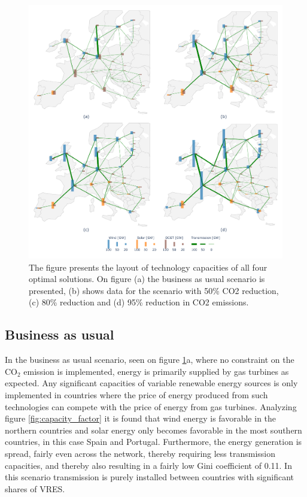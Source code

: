 \begin{figure}[h]\centerfloat
	\includegraphics[width=1.1\textwidth]{./Images/Optimal_solutions}
	\caption{The figure presents the layout of technology capacities of all four optimal solutions. On figure (a) the business as usual scenario is presented, (b) shows data for the scenario with 50\% CO2 reduction, (c) 80\% reduction and (d) 95\% reduction in CO2 emissions.}
	\label{fig:Optimal_Solutions}
\end{figure}

\subsection{Business as usual}
In the business as usual scenario, seen on figure \ref{fig:Optimal_Solutions}a, where no constraint on the $\text{CO}_2$ emission is implemented, energy is primarily supplied by gas turbines as expected. Any significant capacities of variable renewable energy sources is only implemented in countries where the price of energy produced from such technologies can compete with the price of energy from gas turbines. Analyzing figure \ref{fig:capacity_factor} it is found that wind energy is favorable in the northern countries and solar energy only becomes favorable in the most southern countries, in this case Spain and Portugal. 
Furthermore, the energy generation is spread, fairly even across the network, thereby requiring less transmission capacities, and thereby also resulting in a fairly low Gini coefficient of 0.11. In this scenario transmission is purely installed between countries with significant shares of VRES. 

